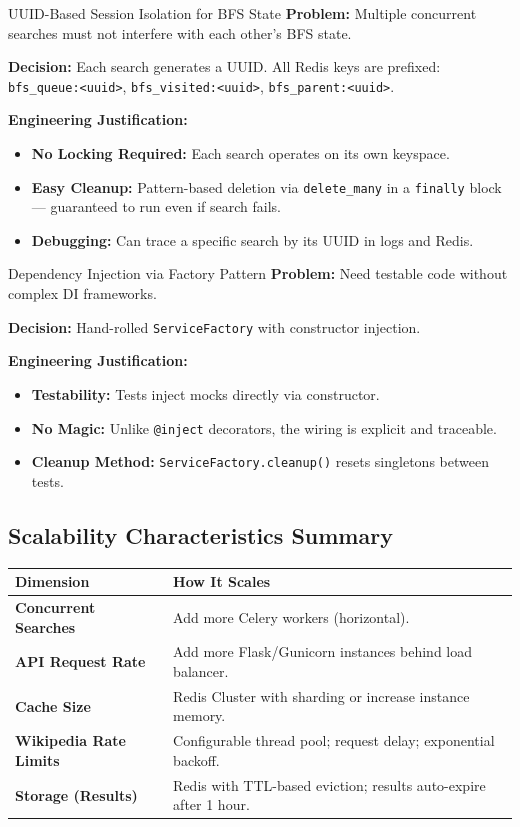 \documentclass[11pt,a4paper]{article}
\begin{document}
\begin{decisionbox}{UUID-Based Session Isolation for BFS State}
\textbf{Problem:} Multiple concurrent searches must not interfere with each other's BFS state.

\textbf{Decision:} Each search generates a UUID. All Redis keys are prefixed: \texttt{bfs\_queue:<uuid>}, \texttt{bfs\_visited:<uuid>}, \texttt{bfs\_parent:<uuid>}.

\textbf{Engineering Justification:}
\begin{itemize}[leftmargin=*, nosep]
    \item \textbf{No Locking Required:} Each search operates on its own keyspace.
    \item \textbf{Easy Cleanup:} Pattern-based deletion via \texttt{delete\_many} in a \texttt{finally} block --- guaranteed to run even if search fails.
    \item \textbf{Debugging:} Can trace a specific search by its UUID in logs and Redis.
\end{itemize}
\end{decisionbox}

\begin{decisionbox}{Dependency Injection via Factory Pattern}
\textbf{Problem:} Need testable code without complex DI frameworks.

\textbf{Decision:} Hand-rolled \texttt{ServiceFactory} with constructor injection.

\textbf{Engineering Justification:}
\begin{itemize}[leftmargin=*, nosep]
    \item \textbf{Testability:} Tests inject mocks directly via constructor.
    \item \textbf{No Magic:} Unlike \texttt{@inject} decorators, the wiring is explicit and traceable.
    \item \textbf{Cleanup Method:} \texttt{ServiceFactory.cleanup()} resets singletons between tests.
\end{itemize}
\end{decisionbox}

\subsection{Scalability Characteristics Summary}

\begin{tabularx}{\textwidth}{@{}>{\bfseries}l X@{}}
\toprule
Dimension & How It Scales \\
\midrule
Concurrent Searches & Add more Celery workers (horizontal). \\
\addlinespace[0.3em]
API Request Rate & Add more Flask/Gunicorn instances behind load balancer. \\
\addlinespace[0.3em]
Cache Size & Redis Cluster with sharding or increase instance memory. \\
\addlinespace[0.3em]
Wikipedia Rate Limits & Configurable thread pool; request delay; exponential backoff. \\
\addlinespace[0.3em]
Storage (Results) & Redis with TTL-based eviction; results auto-expire after 1 hour. \\
\bottomrule
\end{tabularx}
\end{document}
